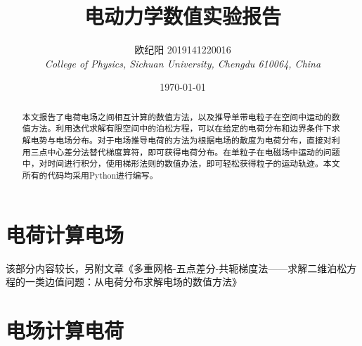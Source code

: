 \documentclass{article} %
\title{电动力学数值实验报告} %
\author{欧纪阳 2019141220016\\ \textit{College of Physics, Sichuan University, Chengdu 610064, China}} %
\date{\today} %
\begin{document}
\maketitle %
\begin{abstract} %
    \quad 本文报告了电荷电场之间相互计算的数值方法，以及推导单带电粒子在空间中运动的数值方法。利用迭代求解有限空间中的泊松方程，可以在给定的电荷分布和边界条件下求解电势与电场分布。对于电场推导电荷的方法为根据电场的散度为电荷分布，直接对利用三点中心差分法替代梯度算符，即可获得电荷分布。在单粒子在电磁场中运动的问题中，对时间进行积分，使用梯形法则的数值办法，即可轻松获得粒子的运动轨迹。本文所有的代码均采用Python进行编写。
\end{abstract}

\tableofcontents %
\thispagestyle{empty} %

\newpage

\part{电荷计算电场}
该部分内容较长，另附文章《多重网格-五点差分-共轭梯度法——求解二维泊松方程的一类边值问题：从电荷分布求解电场的数值方法》

\part{电场计算电荷}
\end{document}

